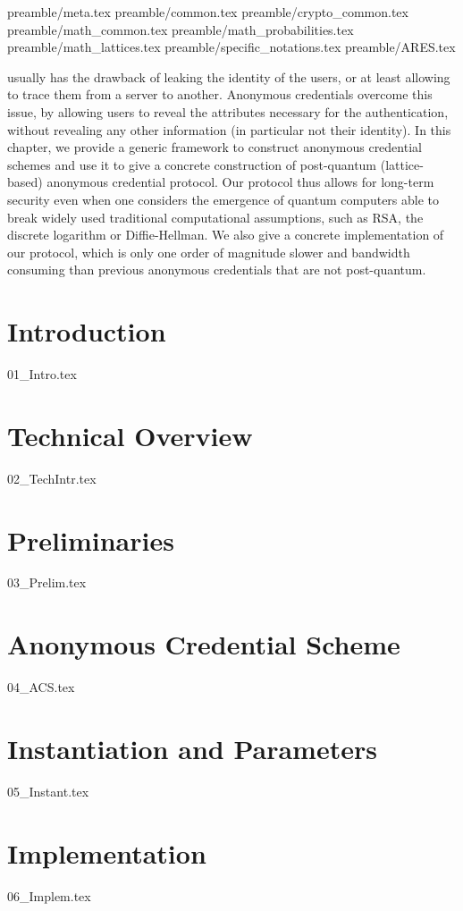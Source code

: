 {

{preamble/meta.tex}
{preamble/common.tex}
{preamble/crypto_common.tex}
{preamble/math_common.tex}
{preamble/math_probabilities.tex}
{preamble/math_lattices.tex}
{preamble/specific_notations.tex}
{preamble/ARES.tex}



 \label{cha:groupsig}


 usually has the drawback of 
leaking the identity of the users, or at least allowing to trace them from a 
server to another. Anonymous credentials overcome this issue, by allowing 
users to reveal the attributes necessary for the authentication, without 
revealing any other information (in particular not their identity). In this 
chapter, we provide a generic framework to construct anonymous credential 
schemes and use it to give a concrete construction of post-quantum 
(lattice-based) anonymous credential protocol. Our protocol thus allows for 
long-term security even when one considers the emergence of quantum computers 
able to break widely used traditional computational assumptions, such as RSA, 
the discrete logarithm or Diffie-Hellman. We also give a concrete 
implementation of our protocol, which is only one order of magnitude slower 
and bandwidth consuming than previous anonymous credentials that are not 
post-quantum.

\section{Introduction}\label{sec:introduction}
{01_Intro.tex}

\section{Technical Overview}\label{sec:technical_details}
{02_TechIntr.tex}

\section{Preliminaries}\label{sec:preliminaries}
{03_Prelim.tex}

\section{Anonymous Credential Scheme}\label{sec:anonymous_credential_scheme}
{04_ACS.tex}

\section{Instantiation and Parameters}\label{sec:instanciation_parameters}
\label{sec:Instanciation}
{05_Instant.tex}

\section{Implementation}\label{sec:implementation}
{06_Implem.tex}

\iffalse


\fi

}
